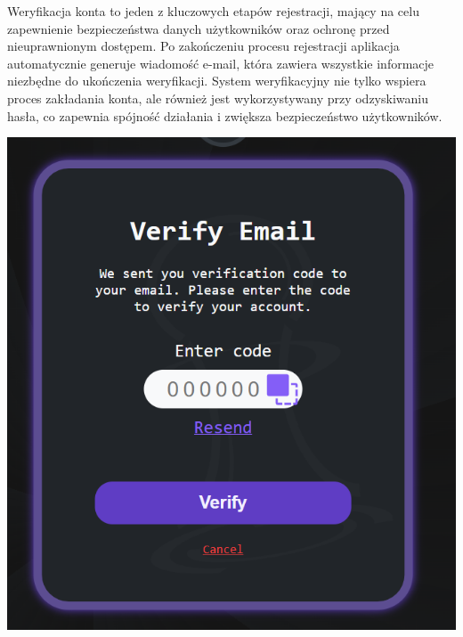 \documentclass[twoside]{projektInzynierskiMS1}
\begin{document}
\noindent
\begin{minipage}[t]{0.55\textwidth} 
    \vspace{0pt} 
    \justifying 
    \noindent 
    Weryfikacja konta to jeden z kluczowych etapów rejestracji, mający na celu zapewnienie bezpieczeństwa danych użytkowników oraz ochronę przed nieuprawnionym dostępem. Po zakończeniu procesu rejestracji aplikacja automatycznie generuje wiadomość e-mail, która zawiera wszystkie informacje niezbędne do ukończenia weryfikacji. System weryfikacyjny nie tylko wspiera proces zakładania konta, ale również jest wykorzystywany przy odzyskiwaniu hasła, co zapewnia spójność działania i zwiększa bezpieczeństwo użytkowników. 
\end{minipage} 
\hfill 
\begin{minipage}[t]{0.35\textwidth} 
    \vspace{0pt} 
    \centering 
    \includegraphics[width=\linewidth]{images/ins_min_ver.png} 
\end{minipage}

\vspace{1cm}
\end{document}
